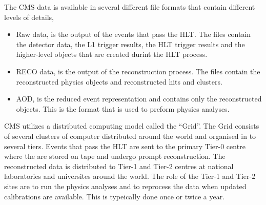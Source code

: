 The \ac{CMS} data is available in several different file formats that contain
different levels of details,
\begin{itemize}
\item Raw data, is the output of the events that pass the \ac{HLT}. The files
contain the detector data, the \ac{L1} trigger results, the \ac{HLT} trigger
results and the higher-level objects that are created durint the \ac{HLT}
process.
\item \ac{RECO} data, is the output of the reconstruction process. The files contain
the reconstructed physics objects and reconstructed hits and clusters.
\item \ac{AOD}, is the reduced event representation and contains only the
reconstructed objects. This is the format that is used to preform physics
analyses.
\end{itemize}

CMS utilizes a distributed computing model called the ``Grid''.
The Grid consists of several clusters of computer distributed around the world
and organised in to several tiers.
Events that pass the \ac{HLT} are sent to the primary Tier-0 centre where the
are stored on tape and undergo prompt reconstruction. The reconstructed data is
distributed to Tier-1 and Tier-2 centres at national laboratories and
universites around the world. The role of the Tier-1 and Tier-2 sites are to run
the physics analyses and to reprocess the data when updated calibrations are
available. This is typeically done once or twice a year.

